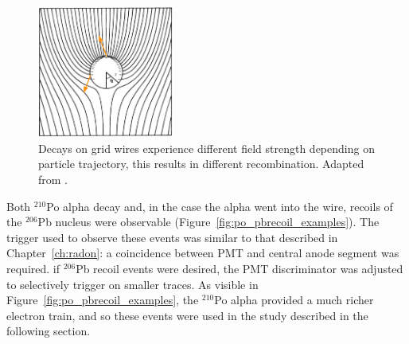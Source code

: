 \begin{figure}[htbp]
\begin{center}
\includegraphics[width=0.4\textwidth]{figures/etrains/field_variation.png}
\caption{Decays on grid wires experience different field strength depending on particle trajectory, this results in different recombination. Adapted from \cite{Blum2008}. }
\label{fig:field_variation}
\end{center}
\end{figure}

Both $^{210}$Po alpha decay and, in the case the alpha went into the wire, recoils of the $^{206}$Pb nucleus were observable (Figure~\ref{fig:po_pbrecoil_examples}). The trigger used to observe these events was similar to that described in Chapter~\ref{ch:radon}: a coincidence between \ac{PMT} and central anode segment was required. if $^{206}$Pb recoil events were desired, the \ac{PMT} discriminator was adjusted to selectively trigger on smaller traces. As visible in Figure~\ref{fig:po_pbrecoil_examples}, the $^{210}$Po alpha provided a much richer electron train, and so these events were used in the study described in the following section.

